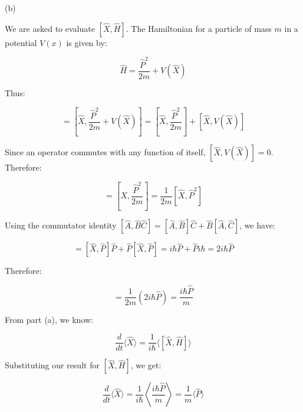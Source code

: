 \documentclass{article}
\begin{document}
\noindent (b)

\noindent We are asked to evaluate $[\hat{X}, \hat{H}]$. The Hamiltonian for a particle of mass $m$ in a potential $V(x)$ is given by:

\begin{equation}
\hat{H} = \frac{\hat{P}^2}{2m} + V(\hat{X})
\end{equation}

\noindent Thus:

\begin{equation}
[\hat{X}, \hat{H}] = \left[\hat{X}, \frac{\hat{P}^2}{2m} + V(\hat{X})\right] = \left[\hat{X}, \frac{\hat{P}^2}{2m}\right] + [\hat{X}, V(\hat{X})]
\end{equation}

\noindent Since an operator commutes with any function of itself, $[\hat{X}, V(\hat{X})] = 0$. Therefore:

\begin{equation}
[\hat{X}, \hat{H}] = \left[\hat{X}, \frac{\hat{P}^2}{2m}\right] = \frac{1}{2m} [\hat{X}, \hat{P}^2]
\end{equation}

\noindent Using the commutator identity $[\hat{A}, \hat{B}\hat{C}] = [\hat{A}, \hat{B}]\hat{C} + \hat{B}[\hat{A}, \hat{C}]$, we have:

\begin{equation}
[\hat{X}, \hat{P}^2] = [\hat{X}, \hat{P}]\hat{P} + \hat{P}[\hat{X}, \hat{P}] = i\hbar \hat{P} + \hat{P}i\hbar = 2i\hbar \hat{P}
\end{equation}

\noindent Therefore:

\begin{equation}
[\hat{X}, \hat{H}] = \frac{1}{2m} (2i\hbar \hat{P}) = \frac{i\hbar \hat{P}}{m}
\end{equation}

\noindent From part (a), we know:

\begin{equation}
\frac{d}{dt} \langle \hat{X} \rangle = \frac{1}{i\hbar} \langle [\hat{X}, \hat{H}] \rangle
\end{equation}

\noindent Substituting our result for $[\hat{X}, \hat{H}]$, we get:

\begin{equation}
\frac{d}{dt} \langle \hat{X} \rangle = \frac{1}{i\hbar} \left\langle \frac{i\hbar \hat{P}}{m} \right\rangle = \frac{1}{m} \langle \hat{P} \rangle
\end{equation}
\end{document}
